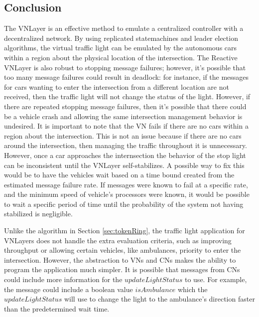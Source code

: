 \documentclass[12pt]{article}
\begin{document}
\subsection{Conclusion}
The VNLayer is an effective method to emulate a centralized controller with a decentralized network.  By using replicated statemachines and leader election algorithms, the virtual traffic light can be emulated by the autonomous cars within a region about the physical location of the intersection.  The Reactive VNLayer is also robust to stopping message failures; however, it's possible that too many message failures could result in deadlock: for instance, if the messages for cars wanting to enter the intersection from a different location are not received, then the traffic light will not change the status of the light. However, if there are repeated stopping message failures, then it's possible that there could be a vehicle crash and allowing the same intersection management behavior is undesired.  
It is important to note that the VN fails if there are no cars within a region about the intersection. This is not an issue because if there are no cars around the intersection, then managing the traffic throughout it is unnecessary.  However, once a car approaches the internsection the behavior of the stop light can be inconsistent until the VNLayer self-stabilizes. A possible way to fix this would be to have the vehicles wait based on a time bound created from the estimated message failure rate. If messages were known to fail at a specific rate, and the minimum speed of vehicle's processors were known, it would be possible to wait a specific period of time until the probability of the system not having stabilized is negligible.

Unlike the algorithm in Section \ref{sec:tokenRing}, the traffic light application for VNLayers does not handle the extra evaluation criteria, such as improving throughput or allowing certain vehicles, like ambulances, priority to enter the intersection.  However, the abstraction to VNs and CNs makes the ability to program the application much simpler.  It is possible that messages from CNs could include more information for the $updateLightStatus$ to use.  For example, the message could include a boolean value $isAmbulance$ which the $updateLightStatus$ will use to change the light to the ambulance's direction faster than the predetermined wait time. 
\end{document}
